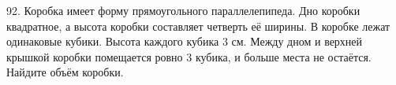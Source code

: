 92. Коробка имеет форму прямоугольного параллелепипеда. Дно коробки квадратное, а высота коробки составляет четверть её ширины. В коробке лежат одинаковые кубики. Высота каждого кубика 3 см. Между дном и верхней крышкой коробки помещается ровно 3 кубика, и больше места не остаётся. Найдите объём коробки.\\
